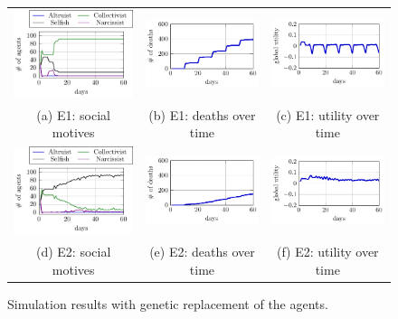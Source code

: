 \begin{figure}[htb]
    \centering
    \begin{tabular}{ccc}
    \includegraphics[width=0.3\linewidth]{008_team_6_agent_design/E/E1_SM.pdf} &   \includegraphics[width=0.3\linewidth]{008_team_6_agent_design/E/E1_deaths.pdf} &
    \includegraphics[width=0.3\linewidth]{008_team_6_agent_design/E/E1_utility.pdf}\\[0pt]
    (a) E1: social motives & (b) E1: deaths over time & (c) E1: utility over time \\[8pt]
         \includegraphics[width=0.3\linewidth]{008_team_6_agent_design/E/E2_SM.pdf} &   \includegraphics[width=0.3\linewidth]{008_team_6_agent_design/E/E2_deaths.pdf} &
    \includegraphics[width=0.3\linewidth]{008_team_6_agent_design/E/E2_utility.pdf}\\[0pt]
    (d) E2: social motives & (e) E2: deaths over time & (f) E2: utility over time 
    \end{tabular}
    \caption{Simulation results with genetic replacement of the agents.}
    \label{fig:res_E}%
\end{figure}


